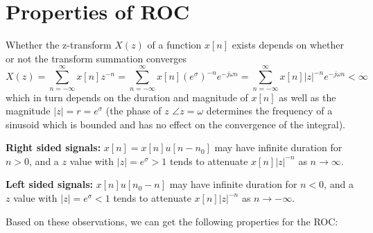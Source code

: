 \newpage
\section*{Properties of ROC}	

Whether the z-transform $X(z)$ of a function $x[n]$ exists depends on whether
or not the transform summation converges 
\[ X(z)=\sum_{n=-\infty}^\infty x[n]z^{-n}
	=\sum_{n=-\infty}^\infty x[n] (e^{\sigma})^{-n} e^{-j\omega n}
	=\sum_{n=-\infty}^\infty x[n] |z|^{-n} e^{-j\omega n} < \infty \]
which in turn depends on the duration and magnitude of $x[n]$ as well as the 
magnitude $|z|=r=e^\sigma$ (the phase of $z$ $\angle{z}=\omega$ determines the 
frequency of a sinusoid which is bounded and has no effect on the convergence 
of the integral). 

{\bf Right sided signals: } $x[n]=x[n]u[n-n_0]$ may have infinite duration for 
$n>0$, and a $z$ value with $|z|=e^{\sigma}>1$ tends to attenuate $x[n]|z|^{-n}$ as 
$n \rightarrow \infty$. 

{\bf Left sided signals: } $x[n]u[n_0-n]$ may have infinite duration for $n<0$, 
and a $z$ value with $|z|=e^{\sigma}<1$ tends to attenuate $x[n]|z|^{-n}$ as 
$n \rightarrow -\infty$.  

Based on these observations, we can get the following properties for the ROC:


